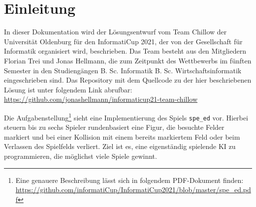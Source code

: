 \chapter{Einleitung}
\label{ch:einleitung}

In dieser Dokumentation wird der Lösungsentwurf vom Team Chillow der Universität Oldenburg für den InformatiCup 2021,
der von der Gesellschaft für Informatik organisiert wird, beschrieben.
Das Team besteht aus den Mitgliedern Florian Trei und Jonas Hellmann, die zum Zeitpunkt des Wettbewerbs im fünften
Semester in den Studiengängen B. Sc. Informatik \bzw B. Sc. Wirtschaftsinformatik eingeschrieben sind.
Das Repository mit dem Quellcode zu der hier beschriebenen Lösung ist unter folgendem Link abrufbar:
\url{https://github.com/jonashellmann/informaticup21-team-chillow}

Die Aufgabenstellung\footnote{Eine genauere Beschreibung lässt sich in folgendem PDF-Dokument finden:
\url{https://github.com/informatiCup/InformatiCup2021/blob/master/spe\_ed.pdf}} sieht eine Implementierung des Spiels
\texttt{spe\_ed} vor.
Hierbei steuern bis zu sechs Spieler rundenbasiert eine Figur, die besuchte Felder markiert und bei einer Kollision
mit einem bereits markiertem Feld oder beim Verlassen des Spielfelds verliert.
Ziel ist es, eine eigenständig spielende \ac{KI} zu programmieren, die möglichst viele Spiele gewinnt.